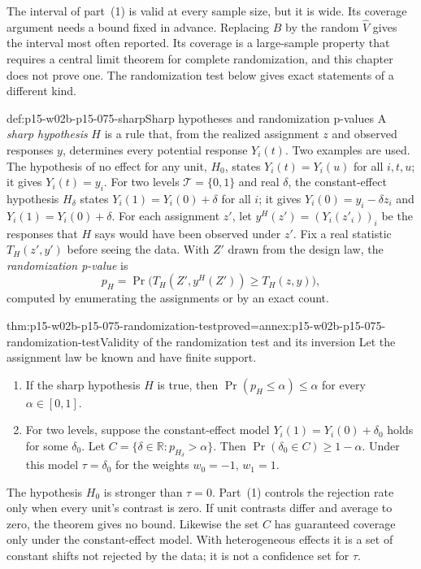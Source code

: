 The interval of part~(1) is valid at every sample size, but it is wide. Its
coverage argument needs a bound fixed in advance. Replacing \(B\) by the random
\(\widehat V\) gives the interval most often reported. Its coverage is a
large-sample property that requires a central limit theorem for
complete randomization, and this chapter does not prove one. The randomization
test below gives exact statements of a different kind.

\begin{hbdefinition}{def:p15-w02b-p15-075-sharp}{Sharp hypotheses and randomization p-values}
A \emph{sharp hypothesis} \(H\) is a rule that, from the realized assignment
\(z\) and observed responses \(y\), determines every potential response
\(Y_i(t)\). Two examples are used. The hypothesis of no effect for any unit,
\(H_0\), states \(Y_i(t)=Y_i(u)\) for all \(i,t,u\); it gives
\(Y_i(t)=y_i\). For two levels \(\mathcal T=\{0,1\}\) and real \(\delta\), the
constant-effect hypothesis \(H_\delta\) states \(Y_i(1)=Y_i(0)+\delta\) for
all \(i\); it gives \(Y_i(0)=y_i-\delta z_i\) and
\(Y_i(1)=Y_i(0)+\delta\). For each assignment \(z'\), let
\(y^H(z')=(Y_i(z'_i))_i\) be the responses that \(H\) says would have been
observed under \(z'\). Fix a real statistic \(T_H(z',y')\) before seeing the
data. With \(Z'\) drawn from the design law, the \emph{randomization
p-value} is
\[
 p_H=\Pr\bigl(T_H(Z',y^H(Z'))\geq T_H(z,y)\bigr),
\]
computed by enumerating the assignments or by an exact count.
\end{hbdefinition}

\begin{hbtheorem}{thm:p15-w02b-p15-075-randomization-test}{proved=annex:p15-w02b-p15-075-randomization-test}{Validity of the randomization test and its inversion}
Let the assignment law be known and have finite support.
\begin{enumerate}
\item If the sharp hypothesis \(H\) is true, then
\(\Pr(p_H\leq\alpha)\leq\alpha\) for every \(\alpha\in[0,1]\).
\item For two levels, suppose the constant-effect model
\(Y_i(1)=Y_i(0)+\delta_0\) holds for some \(\delta_0\). Let
\(C=\{\delta\in\mathbb R:p_{H_\delta}>\alpha\}\). Then
\(\Pr(\delta_0\in C)\geq1-\alpha\). Under this model
\(\tau=\delta_0\) for the weights \(w_0=-1\), \(w_1=1\).
\end{enumerate}
\end{hbtheorem}

The hypothesis \(H_0\) is stronger than \(\tau=0\). Part~(1) controls the
rejection rate only when every unit's contrast is zero. If unit contrasts
differ and average to zero, the theorem gives no bound. Likewise the set \(C\)
has guaranteed coverage only under the constant-effect model. With
heterogeneous effects it is a set of constant shifts not rejected by the data;
it is not a confidence set for \(\tau\).

